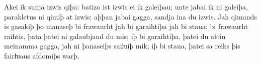 \smallskip


Akei ik sunja izwis qiþa: batizo ist izwis ei ik galeiþau; unte jabai ik ni
galeiþa, parakletus ni qimiþ at izwis; aþþan jabai gagga, sandja ina du
izwis. Jah qimands is gasakiþ þo manaseþ bi frawaurht jah bi garaihtiþa
jah bi staua; bi frawaurht raihtis, þata þatei ni galaubjand du mis; iþ bi
garaihtiþa, þatei du attin meinamma gagga, jah ni þanaseiþs saiƕiþ mik;
iþ bi staua, þatei sa reiks þis fairƕaus afdomiþs warþ.
















